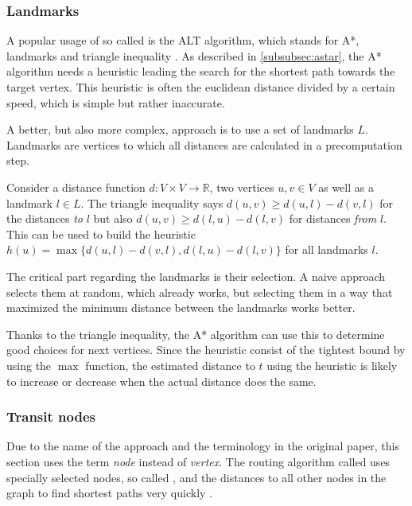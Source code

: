 		\subsubsection{Landmarks}
		
			A popular usage of so called  is the ALT algorithm, which stands for A*, landmarks and triangle inequality \cite{goldberg-landmarks}.
			As described in \cref{subsubsec:astar}, the A* algorithm needs a heuristic leading the search for the shortest path towards the target vertex.
			This heuristic is often the euclidean distance divided by a certain speed, which is simple but rather inaccurate.
			
			A better, but also more complex, approach is to use a set of landmarks $L$.
			Landmarks are vertices to which all distances are calculated in a precomputation step.
			
			Consider a distance function $d : V \times V \rightarrow \mathbb{R}$, two vertices $u, v \in V$ as well as a landmark $l \in L$.
			The triangle inequality says $d(u,v) \geq d(u,l) - d(v,l)$ for the distances \emph{to} $l$ but also $d(u,v) \geq d(l,u) - d(l,v)$ for distances \emph{from} $l$.
			This can be used to build the heuristic $h(u) = \max \{ d(u,l)-d(v,l), d(l,u)-d(l,v) \}$ for all landmarks $l$.
			
			The critical part regarding the landmarks is their selection.
			A naive approach selects them at random, which already works, but selecting them in a way that maximized the minimum distance between the landmarks works better.
			
			Thanks to the triangle inequality, the A* algorithm can use this to determine good choices for next vertices.
			Since the heuristic consist of the tightest bound by using the $\max$ function, the estimated distance to $t$ using the heuristic is likely to increase or decrease when the actual distance does the same.
		
		\subsubsection{Transit nodes}
		\label{subsubsec:transit}
		
			Due to the name of the approach and the terminology in the original paper, this section uses the term \emph{node} instead of \emph{vertex}.
			The routing algorithm called  uses specially selected nodes, so called , and the distances to all other nodes in the graph to find shortest paths very quickly \cite{bast-transit}.
		
